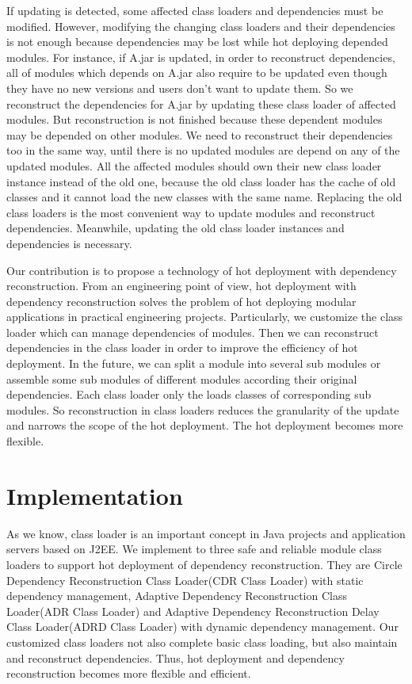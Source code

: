 \documentclass[conference]{IEEEtran}
\begin{document}
If updating is detected, some affected class loaders and dependencies must be modified.
However, modifying the changing class loaders and their dependencies is not enough because dependencies may be lost while hot deploying depended modules.
For instance, if A.jar is updated, in order to reconstruct dependencies, all of modules which depends on A.jar also require to be updated even though they have no new versions and users don't want to update them.
So we reconstruct the dependencies for A.jar by updating these class loader of affected modules.
But reconstruction is not finished because these dependent modules may be depended on other modules.
We need to reconstruct their dependencies too in the same way, until there is no updated modules are depend on any of the updated modules.
All the affected modules should own their new class loader instance instead of the old one, because the old class loader has the cache of old classes and it cannot load the new classes with the same name.
Replacing the old class loaders is the most convenient way to update modules and reconstruct dependencies.
Meanwhile, updating the old class loader instances and dependencies is necessary. 

Our contribution is to propose a technology of hot deployment with dependency reconstruction.
From an engineering point of view, hot deployment with dependency reconstruction solves the problem of hot deploying modular applications in practical engineering projects.
Particularly, we customize the class loader which can manage dependencies of modules.
Then we can reconstruct dependencies in the class loader in order to improve the efficiency of hot deployment.
In the future, we can split a module into several sub modules or assemble some sub modules of different modules according their original dependencies.
Each class loader only the loads classes of corresponding sub modules.
So reconstruction in class loaders reduces the granularity of the update and narrows the scope of the hot deployment.
The hot deployment becomes more flexible. 




\section{Implementation\label{sec:implementation}}
As we know, class loader is an important concept in Java projects and application servers based on J2EE.
We implement to three safe and reliable module class loaders to support hot deployment of dependency reconstruction.
They are Circle Dependency Reconstruction Class Loader(CDR Class Loader) with static dependency management, Adaptive Dependency Reconstruction Class Loader(ADR Class Loader) and Adaptive Dependency Reconstruction Delay Class Loader(ADRD Class Loader) with dynamic dependency management.
Our customized class loaders not also complete basic class loading, but also maintain and reconstruct dependencies.
Thus, hot deployment and dependency reconstruction becomes more flexible and efficient.
\end{document}
